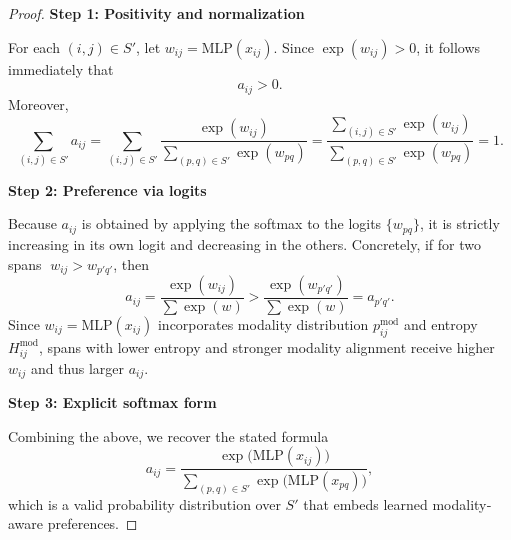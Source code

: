 \begin{proof}
	\textbf{Step 1: Positivity and normalization}
	
	For each \((i,j)\in S'\), let \(w_{ij} = \mathrm{MLP}(x_{ij})\).  Since \(\exp(w_{ij})>0\), it follows immediately that
	\[
	a_{ij} > 0.
	\]
	Moreover,
	\[
	\sum_{(i,j)\in S'} a_{ij}
	= \sum_{(i,j)\in S'} \frac{\exp(w_{ij})}{\sum_{(p,q)\in S'}\exp(w_{pq})}
	= \frac{\sum_{(i,j)\in S'}\exp(w_{ij})}{\sum_{(p,q)\in S'}\exp(w_{pq})}
	= 1.
	\]
	
	\textbf{Step 2: Preference via logits}
	
	Because \(a_{ij}\) is obtained by applying the softmax to the logits \(\{w_{pq}\}\), it is strictly increasing in its own logit and decreasing in the others.  Concretely, if for two spans
	\(\;w_{ij} > w_{p'q'}\), then
	\[
	a_{ij} = \frac{\exp(w_{ij})}{\sum\exp(w)} 
	> \frac{\exp(w_{p'q'})}{\sum\exp(w)} = a_{p'q'}.
	\]
	Since \(w_{ij}=\mathrm{MLP}(x_{ij})\) incorporates modality distribution \(p^{\mathrm{mod}}_{ij}\) and entropy \(H^{\mathrm{mod}}_{ij}\), spans with lower entropy and stronger modality alignment receive higher \(w_{ij}\) and thus larger \(a_{ij}\).
	
	\textbf{Step 3: Explicit softmax form}
	
	Combining the above, we recover the stated formula
	\[
	a_{ij}
	= \frac{\exp\bigl(\mathrm{MLP}(x_{ij})\bigr)}
	{\sum_{(p,q)\in S'} \exp\bigl(\mathrm{MLP}(x_{pq})\bigr)},
	\]
	which is a valid probability distribution over \(S'\) that embeds learned modality‐aware preferences.
\end{proof}